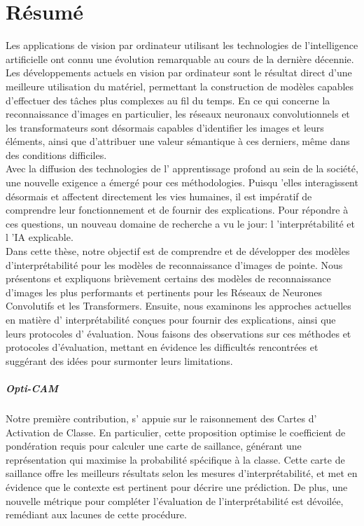 \chapter*{Résumé}
Les applications de vision par ordinateur utilisant les technologies de l'intelligence artificielle 
ont connu une évolution remarquable au cours de la dernière décennie. Les développements actuels en 
vision par ordinateur sont le résultat direct d'une meilleure utilisation du matériel, permettant 
la construction de modèles capables d'effectuer des tâches plus complexes au fil du temps. En ce 
qui concerne la reconnaissance d'images en particulier, les réseaux neuronaux convolutionnels et 
les transformateurs sont désormais capables d'identifier les images et leurs éléments, ainsi que 
d'attribuer une valeur sémantique à ces derniers, même dans des conditions difficiles.\\

\noindent Avec la diffusion des technologies de l' apprentissage profond au sein de la société, 
une nouvelle exigence a émergé pour ces méthodologies. Puisqu 'elles interagissent désormais et 
affectent directement les vies humaines, il est impératif de comprendre leur fonctionnement et de 
fournir des explications. Pour répondre à ces questions, un nouveau domaine de recherche a vu le 
jour: l 'interprétabilité et l 'IA explicable.\\

\noindent Dans cette thèse, notre objectif est de comprendre et de développer des modèles 
d'interprétabilité pour les modèles de reconnaissance d'images de pointe. Nous présentons et 
expliquons brièvement certains des modèles de reconnaissance d'images les plus performants et 
pertinents pour les Réseaux de Neurones Convolutifs et les Transformers. Ensuite, nous examinons 
les approches actuelles en matière d' interpr\'etabilit\'e conçues pour fournir des explications, 
ainsi que leurs protocoles d' évaluation. Nous faisons des observations sur ces méthodes et 
protocoles d'évaluation, mettant en évidence les difficultés rencontrées et suggérant des idées 
pour surmonter leurs limitations.\\

\paragraph{Opti-CAM} Notre première contribution, s' appuie sur le raisonnement des Cartes d' 
Activation de Classe. En particulier, cette proposition optimise le coefficient de pondération 
requis pour calculer une carte de saillance, générant une représentation qui maximise la 
probabilité spécifique à la classe. Cette carte de saillance offre les meilleurs résultats selon 
les mesures d'interprétabilité, et met en évidence que le contexte est pertinent pour décrire une 
prédiction. De plus, une nouvelle métrique pour compléter l'évaluation de l'interprétabilité est 
dévoilée, remédiant aux lacunes de cette procédure.\\

